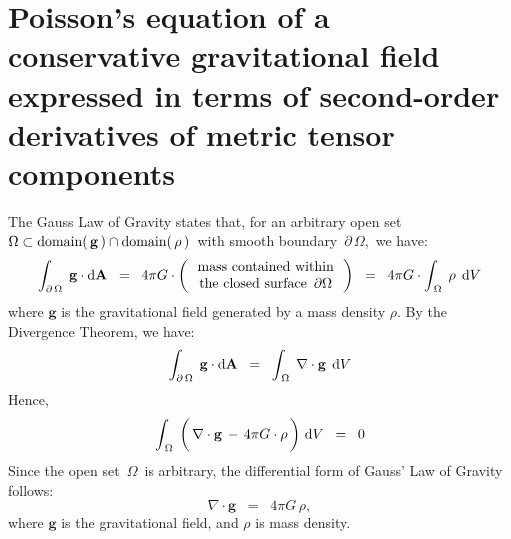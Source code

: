 

\section{Poisson's equation of a conservative gravitational field expressed in terms of second-order derivatives of metric tensor components}
\setcounter{theorem}{0}
\setcounter{equation}{0}


\renewcommand{\theenumi}{\roman{enumi}}
\renewcommand{\labelenumi}{\textnormal{(\theenumi)}$\;\;$}


The Gauss Law of Gravity states that,
for an arbitrary open set
\,$\Omega \subset \textnormal{domain}(\,\mathbf{g}\,) \cap \textnormal{domain}(\,\rho\,)$\,
with smooth boundary \,$\partial\,\Omega$,\,
we have:
\begin{equation*}
\int_{\partial\,\Omega}\;\mathbf{g} \cdot \textnormal{d}\mathbf{A}
\;\; = \;\;
	4 \pi G \cdot
	\left(\,
		\begin{array}{c}
		\textnormal{mass contained within}
		\\
		\textnormal{the closed surface \,$\partial\Omega$}
		\end{array}
		\,\right)
\;\; = \;\;
	4 \pi G \cdot
	\int_{\,\Omega}\; \rho \,\;\textnormal{d} V
\end{equation*}
where $\mathbf{g}$ is the gravitational field generated by a mass density  $\rho$.
By the Divergence Theorem, we have:
\begin{equation*}
\int_{\partial\,\Omega}\;\mathbf{g} \cdot \textnormal{d}\mathbf{A}
\;\; = \;\;
	\int_{\,\Omega}\; \nabla \cdot \mathbf{g} \,\;\textnormal{d} V
\end{equation*}
Hence,
\begin{equation*}
\int_{\,\Omega}\;
	\left(\,
		\nabla \cdot \mathbf{g}
		\, \overset{{\color{white}\textnormal{\small1}}}{-} \,
		4 \pi G \cdot \rho
		\,\right)
	\,\d V
\;\; = \;\;
	0
\end{equation*}
Since the open set \,$\Omega$\, is arbitrary, the differential form of Gauss' Law of Gravity follows:
\begin{equation*}
\nabla \cdot \mathbf{g} \;\; = \;\; 4 \pi G \, \rho,
\end{equation*}
where $\mathbf{g}$ is the gravitational field, and $\rho$ is mass density.

